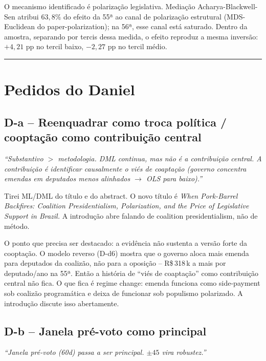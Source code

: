 \documentclass[11pt,a4paper]{article}
\newcommand{\pedido}[1]{\par\medskip\noindent\textit{\textcolor{quotegray}{#1}}\par\smallskip}
\begin{document}
O mecanismo identificado é polarização legislativa. Mediação Acharya-Blackwell-Sen atribui $63{,}8\%$ do efeito da 55ª ao canal de polarização estrutural (MDS-Euclidean do paper-polarization); na 56ª, esse canal está saturado. Dentro da amostra, separando por tercis dessa medida, o efeito reproduz a mesma inversão: $+4{,}21$ pp no tercil baixo, $-2{,}27$ pp no tercil médio.

\bigskip\hrule\bigskip

\section{Pedidos do Daniel}

\subsection*{D-a -- Reenquadrar como troca política / cooptação como contribuição central}

\pedido{``Substantivo $>$ metodologia. DML continua, mas não é a contribuição central. A contribuição é identificar causalmente o viés de coaptação (governo concentra emendas em deputados menos alinhados $\to$ OLS para baixo).''}

Tirei ML/DML do título e do abstract. O novo título é \emph{When Pork-Barrel Backfires: Coalition Presidentialism, Polarization, and the Price of Legislative Support in Brazil.} A introdução abre falando de coalition presidentialism, não de método.

O ponto que precisa ser destacado: a evidência não sustenta a versão forte da cooptação. O modelo reverso (D-d6) mostra que o governo aloca mais emenda para deputados da coalizão, não para a oposição -- R\$\,318\,k a mais por deputado/ano na 55ª. Então a história de ``viés de coaptação'' como contribuição central não fica. O que fica é regime change: emenda funciona como side-payment sob coalizão programática e deixa de funcionar sob populismo polarizado. A introdução discute isso abertamente.

\subsection*{D-b -- Janela pré-voto como principal}

\pedido{``Janela pré-voto (60d) passa a ser principal. $\pm 45$ vira robustez.''}
\end{document}
